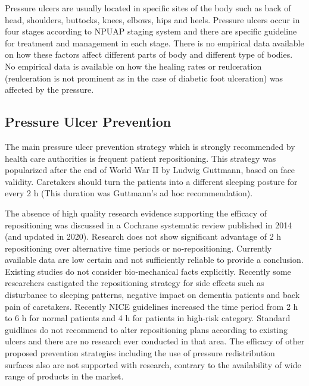 Pressure ulcers are usually located in specific sites of the body such as back of head, shoulders, buttocks,  knees, elbows, hips and heels.  Pressure ulcers occur in four stages according to NPUAP staging system and there are specific guideline for treatment and management in each stage. There is no empirical data available on how these factors affect different parts of body and different type of bodies. No empirical data is available on how the healing rates or reulceration (reulceration is not prominent as in the case of diabetic foot ulceration) was affected by the pressure. 

\subsection{Pressure Ulcer Prevention}
The main pressure ulcer prevention strategy which is strongly recommended by health care authorities is frequent patient repositioning. This strategy was popularized after the end of World War II by Ludwig Guttmann, based on face validity. Caretakers should turn the patients into a different sleeping posture for every 2 h (This duration was Guttmann's ad hoc recommendation). 

The absence of high quality research evidence supporting the efficacy of repositioning was discussed in a Cochrane systematic review published in 2014 (and updated in 2020). Research does not show significant advantage of 2 h repositioning over alternative time periods or no-repositioning. Currently available data are low certain and not sufficiently reliable to provide a conclusion. Existing studies do not consider bio-mechanical facts explicitly. Recently some researchers castigated the repositioning strategy for side effects such as disturbance to sleeping patterns, negative impact on dementia patients and back pain of caretakers. Recently NICE guidelines increased the time period from 2 h to 6 h for normal patients and 4 h for patients in high-risk category. Standard guidlines do not recommend to alter repositioning plans according to existing ulcers and there are no research ever conducted in that area. The efficacy of other proposed prevention strategies including the use of pressure redistribution surfaces also are not supported with research, contrary to the availability of wide range of products in the market.

